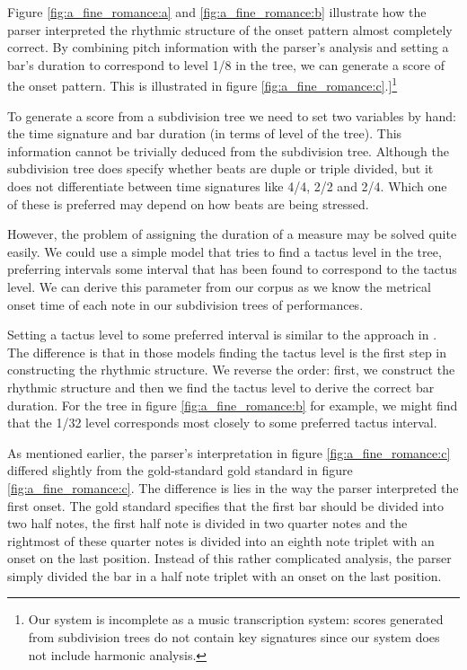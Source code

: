 Figure \ref{fig:a_fine_romance:a} and \ref{fig:a_fine_romance:b} illustrate how the parser interpreted the rhythmic structure of the onset pattern almost completely correct. By combining pitch information with the parser's analysis and setting a bar's duration to correspond to level 1/8 in the tree, we can generate a score of the onset pattern. This is illustrated in figure \ref{fig:a_fine_romance:c}.]\footnote{Our system is incomplete as a music transcription system: scores generated from subdivision trees do not contain key signatures since our system does not include harmonic analysis.}

To generate a score from a subdivision tree we need to set two variables by hand: the time signature and bar duration (in terms of level of the tree). This information cannot be trivially deduced from the subdivision tree. Although the subdivision tree does specify whether beats are duple or triple divided, but it does not differentiate between time signatures like 4/4, 2/2 and 2/4. Which one of these is preferred may depend on how beats are being stressed.

However, the problem of assigning the duration of a measure may be solved quite easily. We could use a simple model that tries to find a tactus level in the tree, preferring intervals some interval that has been found to correspond to the tactus level. We can derive this parameter from our corpus as we know the metrical onset time of each note in our subdivision trees of performances. 

Setting a tactus level to some preferred interval is similar to the approach in  \citet{temperley2009unified, temperley2007music}. The difference is that in those models finding the tactus level is the first step in constructing the rhythmic structure. We reverse the order: first, we construct the rhythmic structure and then we find the tactus level to derive the correct bar duration. For the tree in figure \ref{fig:a_fine_romance:b} for example, we might find that the 1/32 level corresponds most closely to some preferred tactus interval.

As mentioned earlier, the parser's interpretation in figure \ref{fig:a_fine_romance:c} differed slightly from the gold-standard gold standard in figure \ref{fig:a_fine_romance:c}. The difference is lies in the way the parser interpreted the first onset. The gold standard specifies that the first bar should be divided into two half notes, the first half note is divided in two quarter notes and the rightmost of these quarter notes is divided into an eighth note triplet with an onset on the last position. Instead of this rather complicated analysis, the parser simply divided the bar in a half note triplet with an onset on the last position. 

